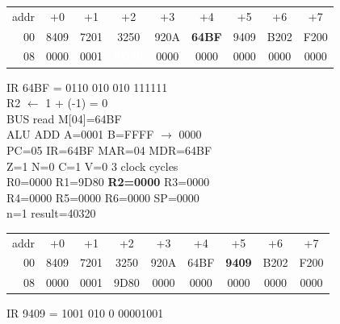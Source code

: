 \begin{tcolorbox}[stepbox, title={Step 39 \hfill PC 03 \quad ST R1, result}]
{\begin{tabular}{@{}r*{8}{c}@{}}
\textcolor{dim}{addr} & \textcolor{dim}{+0} & \textcolor{dim}{+1} & \textcolor{dim}{+2} & \textcolor{dim}{+3} & \textcolor{dim}{+4} & \textcolor{dim}{+5} & \textcolor{dim}{+6} & \textcolor{dim}{+7}\\
\textcolor{dim}{00} & 8409 & 7201 & 3250 & 920A & \cellcolor{pcc}\textbf{64BF} & 9409 & B202 & F200\\
\textcolor{dim}{08} & 0000 & \cellcolor{datac}0001 & \cellcolor{wrt}\textcolor{white}{\textbf{9D80}} & 0000 & 0000 & 0000 & 0000 & 0000\\
\end{tabular}}
\end{tcolorbox}\par\vspace{3pt}
\noindent\begin{tcolorbox}[stepbox, title={Step 40 \hfill PC 04 \quad ADDI R2, R2, -1}]
\textcolor{dim}{IR} 64BF = 0110 010 010 111111\\
R2 $\leftarrow$ 1 + (-1) = 0\\
\textcolor{dim}{BUS} read M[04]=64BF\\
\textcolor{dim}{ALU} ADD A=0001 B=FFFF $\rightarrow$ 0000\\
PC=05 IR=64BF MAR=04 MDR=64BF\\
Z=1 N=0 C=1 V=0 \hfill \textcolor{dim}{3 clock cycles}\\
R0=0000 R1=9D80 \textcolor{wrt}{\textbf{R2=0000}} R3=0000\\
R4=0000 R5=0000 R6=0000 SP=0000\\
\textcolor{dim}{n=1  result=40320}\\[1pt]
{\setlength{\tabcolsep}{1.6pt}\begin{tabular}{@{}r*{8}{c}@{}}
\textcolor{dim}{addr} & \textcolor{dim}{+0} & \textcolor{dim}{+1} & \textcolor{dim}{+2} & \textcolor{dim}{+3} & \textcolor{dim}{+4} & \textcolor{dim}{+5} & \textcolor{dim}{+6} & \textcolor{dim}{+7}\\
\textcolor{dim}{00} & 8409 & 7201 & 3250 & 920A & 64BF & \cellcolor{pcc}\textbf{9409} & B202 & F200\\
\textcolor{dim}{08} & 0000 & \cellcolor{datac}0001 & \cellcolor{datac}9D80 & 0000 & 0000 & 0000 & 0000 & 0000\\
\end{tabular}}
\end{tcolorbox}\hfill\begin{tcolorbox}[stepbox, title={Step 41 \hfill PC 05 \quad ST R2, n}]
\textcolor{dim}{IR} 9409 = 1001 010 0 00001001\\

\end{tcolorbox}
